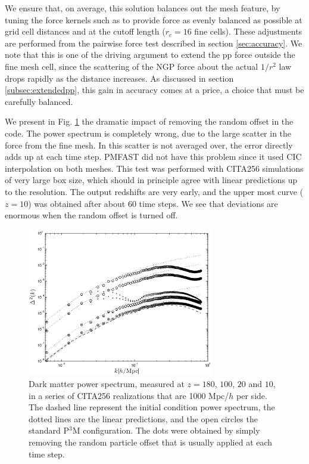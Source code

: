 We ensure that, on average, this solution balances out the mesh feature,
by tuning the force kernels such as to provide  force as evenly balanced as possible at grid cell distances
and at the cutoff length ($r_{c}=16$ fine cells).
These adjustments are performed from the pairwise force test described in section \ref{sec:accuracy}.
We note that this is one of the driving argument to extend the pp force outside the fine mesh cell,
since the scattering of the NGP force about the actual $1/r^{2}$ law drops rapidly as the distance increases.
As discussed in section \ref{subsec:extendedpp}, this gain in accuracy comes at a price,
a choice that  must be carefully balanced.

We present in Fig. \ref{fig:disp_mesh} the dramatic impact of removing the random offset in the code.
The power spectrum is completely wrong, due to the large scatter in the force from the fine mesh.
In this scatter is not averaged over, the error directly adds up at each time step. {\small PMFAST}
did not have this problem since it used CIC interpolation on both meshes.  
This test was performed with CITA256 simulations of very large box size,
which should in principle agree with linear predictions up to the resolution.
The output redshifts are very early, and the upper most curve ($z=10$) was obtained after
about 60 time steps.
We see that deviations are enormous when the random offset is turned off.

\begin{figure}%
  \begin{center}
    \includegraphics[width=3.2in]{graphs/power_w_wo_disp_mesh.eps}
  \caption{Dark matter power spectrum, measured at $z=180$, $100$, $20$ and $10$, in a series of CITA256 realizations that are 1000 Mpc/$h$ per side. The dashed line represent the initial condition power spectrum, the dotted lines are the linear predictions, and  the open circles the standard P$^3$M configuration. 
  The dots were obtained by simply removing the random particle offset that is usually applied at each time step. \label{fig:disp_mesh}}
\end{center}
\end{figure}

